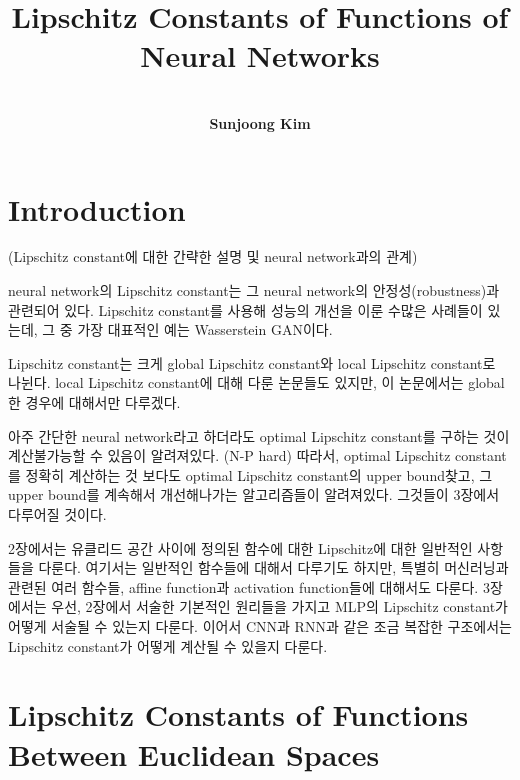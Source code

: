 \documentclass[12pt]{report}
\numberwithin{figure}{chapter}
\theoremstyle{plain}
\theoremstyle{definition}
\theoremstyle{corollary}
\theoremstyle{definition}
\theoremstyle{plain}
\theoremstyle{definition}
\theoremstyle{plain}
\begin{document}
\title{\textbf{Lipschitz Constants of Functions of Neural Networks}}
\author{\\\textbf{Sunjoong Kim}\\}
\setcounter{tocdepth}{1}
\date{}
 \maketitle{}

\tableofcontents

\newpage
\begin{abstract}

\end{abstract}
\newpage
\setcounter{page}{1} \setcounter{section}{0}


\chapter{Introduction}


(Lipschitz constant에 대한 간략한 설명 및 neural network과의 관계)

neural network의 Lipschitz constant는 그 neural network의 안정성(robustness)과 관련되어 있다.
Lipschitz constant를 사용해 성능의 개선을 이룬 수많은 사례들이 있는데, 그 중 가장 대표적인 예는 Wasserstein GAN이다.

Lipschitz constant는 크게 global Lipschitz constant와 local Lipschitz constant로 나뉜다.
local Lipschitz constant에 대해 다룬 논문들도 있지만, 이 논문에서는 global한 경우에 대해서만 다루겠다.

아주 간단한 neural network라고 하더라도 optimal Lipschitz constant를 구하는 것이 계산불가능할 수 있음이 알려져있다. (N-P hard)
따라서, optimal Lipschitz constant를 정확히 계산하는 것 보다도 optimal Lipschitz constant의 upper bound찾고, 그 upper bound를 계속해서 개선해나가는 알고리즘들이 알려져있다. 그것들이 3장에서 다루어질 것이다.

2장에서는 유클리드 공간 사이에 정의된 함수에 대한 Lipschitz에 대한 일반적인 사항들을 다룬다.
여기서는 일반적인 함수들에 대해서 다루기도 하지만, 특별히 머신러닝과 관련된 여러 함수들, affine function과 activation function들에 대해서도 다룬다.
3장에서는 우선, 2장에서 서술한 기본적인 원리들을 가지고 MLP의 Lipschitz constant가 어떻게 서술될 수 있는지 다룬다.
이어서 CNN과 RNN과 같은 조금 복잡한 구조에서는 Lipschitz constant가 어떻게 계산될 수 있을지 다룬다.



\chapter{Lipschitz Constants of Functions Between Euclidean Spaces}
\end{document}
